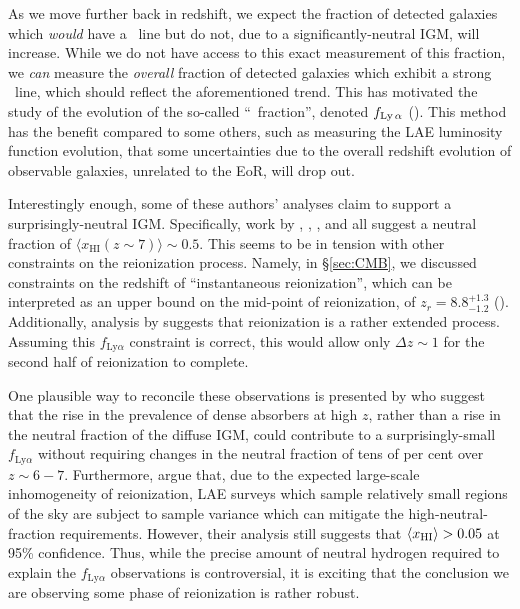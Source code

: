 As we move further back in redshift, we expect the fraction of detected galaxies which \textit{would} have a \lya\ line but do not, due to a significantly-neutral IGM, will increase. While we do not have access to this exact measurement of this fraction, we \textit{can} measure the \textit{overall} fraction of detected galaxies which exhibit a strong \lya\ line, which should reflect the aforementioned trend. This has motivated the study of the evolution of the so-called ``\lya\ fraction'', denoted $f_{\text{Ly$\,\alpha$}}$ (\citealt{Schenker2012,pentericci2011spectroscopic,Pentericci:2014nia,caruana2012no,caruana2014spectroscopy}). This method has the benefit compared to some others, such as measuring the LAE luminosity function evolution, that some uncertainties due to the overall redshift evolution of observable galaxies, unrelated to the EoR, will drop out. 


Interestingly enough, some of these authors' analyses claim to support a surprisingly-neutral IGM. Specifically, work by \cite{caruana2014spectroscopy}, \cite{Pentericci:2014nia}, \cite{pentericci2011spectroscopic}, and \cite{Schenker2012} all suggest a neutral fraction of $\langle x_{\text{HI}}(z \sim 7) \rangle \sim 0.5$. This seems to be in tension with other constraints on the reionization process. Namely, in \S \ref{sec:CMB}, we discussed constraints on the redshift of ``instantaneous reionization'', which can be interpreted as an upper bound on the mid-point of reionization, of $z_{r} = 8.8^{+1.3}_{-1.2}$ (\cite{planck2015planck}). Additionally, analysis by \cite{Bolton:2007b} suggests that reionization is a rather extended process. Assuming this $f_{\text{Ly}\alpha}$ constraint is correct, this would allow only $\Delta z \sim 1$ for the second half of reionization to complete. 


One plausible way to reconcile these observations is presented by \cite{2013MNRAS.429.1695B} who suggest that the rise in the prevalence of dense absorbers at high $z$, rather than a rise in the neutral fraction of the diffuse IGM, could contribute to a surprisingly-small $f_{\text{Ly}\alpha}$ without requiring changes in the neutral fraction of tens of per cent over $z \sim 6-7$. Furthermore, \cite{Taylor:2013qia} argue that, due to the expected large-scale inhomogeneity of reionization, LAE surveys which sample relatively small regions of the sky are subject to sample variance which can mitigate the high-neutral-fraction requirements. However, their analysis still suggests that $\langle x_{\text{HI}}\rangle > 0.05$ at 95\% confidence. Thus, while the precise amount of neutral hydrogen required to explain the $f_{\text{Ly}\alpha}$ observations is controversial, it is exciting that the conclusion we are observing some phase of reionization is rather robust. 

